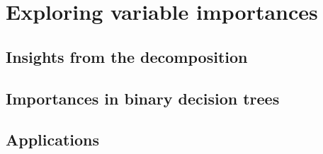 \chapter{Exploring variable importances}\label{ch:applications}

\section{Insights from the decomposition}



\section{Importances in binary decision trees}


%


\section{Applications}


